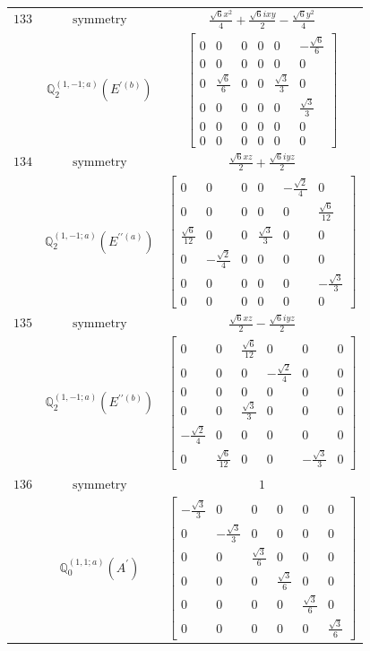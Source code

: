 \documentclass[fleqn,8pt,landscape]{jsarticle}
\begin{document}
\begin{longtable}{ccc}
$ 133 $ & $ \text{symmetry} $ & $ \frac{\sqrt{6} x^{2}}{4} + \frac{\sqrt{6} i x y}{2} - \frac{\sqrt{6} y^{2}}{4} $ \\
$  $ & $ \mathbb{Q}_{2}^{(1,-1;a)}(E^{\prime(b)}) $ & $ \begin{bmatrix} 0 & 0 & 0 & 0 & 0 & - \frac{\sqrt{6}}{6} \\ 0 & 0 & 0 & 0 & 0 & 0 \\ 0 & \frac{\sqrt{6}}{6} & 0 & 0 & \frac{\sqrt{3}}{3} & 0 \\ 0 & 0 & 0 & 0 & 0 & \frac{\sqrt{3}}{3} \\ 0 & 0 & 0 & 0 & 0 & 0 \\ 0 & 0 & 0 & 0 & 0 & 0 \end{bmatrix} $ \\ \hline
$ 134 $ & $ \text{symmetry} $ & $ \frac{\sqrt{6} x z}{2} + \frac{\sqrt{6} i y z}{2} $ \\
$  $ & $ \mathbb{Q}_{2}^{(1,-1;a)}(E^{\prime\prime(a)}) $ & $ \begin{bmatrix} 0 & 0 & 0 & 0 & - \frac{\sqrt{2}}{4} & 0 \\ 0 & 0 & 0 & 0 & 0 & \frac{\sqrt{6}}{12} \\ \frac{\sqrt{6}}{12} & 0 & 0 & \frac{\sqrt{3}}{3} & 0 & 0 \\ 0 & - \frac{\sqrt{2}}{4} & 0 & 0 & 0 & 0 \\ 0 & 0 & 0 & 0 & 0 & - \frac{\sqrt{3}}{3} \\ 0 & 0 & 0 & 0 & 0 & 0 \end{bmatrix} $ \\ \hline
$ 135 $ & $ \text{symmetry} $ & $ \frac{\sqrt{6} x z}{2} - \frac{\sqrt{6} i y z}{2} $ \\
$  $ & $ \mathbb{Q}_{2}^{(1,-1;a)}(E^{\prime\prime(b)}) $ & $ \begin{bmatrix} 0 & 0 & \frac{\sqrt{6}}{12} & 0 & 0 & 0 \\ 0 & 0 & 0 & - \frac{\sqrt{2}}{4} & 0 & 0 \\ 0 & 0 & 0 & 0 & 0 & 0 \\ 0 & 0 & \frac{\sqrt{3}}{3} & 0 & 0 & 0 \\ - \frac{\sqrt{2}}{4} & 0 & 0 & 0 & 0 & 0 \\ 0 & \frac{\sqrt{6}}{12} & 0 & 0 & - \frac{\sqrt{3}}{3} & 0 \end{bmatrix} $ \\ \hline
$ 136 $ & $ \text{symmetry} $ & $ 1 $ \\
$  $ & $ \mathbb{Q}_{0}^{(1,1;a)}(A^{\prime}) $ & $ \begin{bmatrix} - \frac{\sqrt{3}}{3} & 0 & 0 & 0 & 0 & 0 \\ 0 & - \frac{\sqrt{3}}{3} & 0 & 0 & 0 & 0 \\ 0 & 0 & \frac{\sqrt{3}}{6} & 0 & 0 & 0 \\ 0 & 0 & 0 & \frac{\sqrt{3}}{6} & 0 & 0 \\ 0 & 0 & 0 & 0 & \frac{\sqrt{3}}{6} & 0 \\ 0 & 0 & 0 & 0 & 0 & \frac{\sqrt{3}}{6} \end{bmatrix} $ \\ \hline

\end{longtable}
\end{document}
